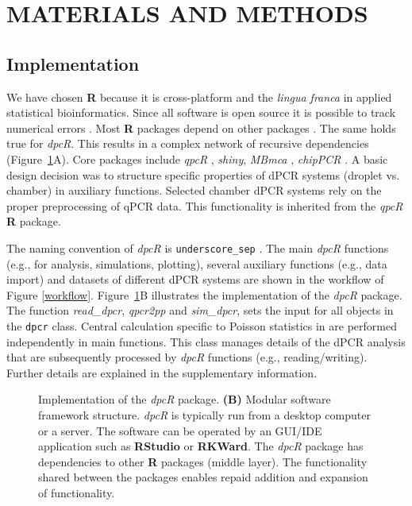 \documentclass[a4,center,fleqn]{NAR}
\begin{document}
\section{MATERIALS AND METHODS}

\subsection{Implementation}

We have chosen \textbf{R} because it is cross-platform and the \textit{lingua 
franca} in applied statistical bioinformatics. Since all software is open 
source 
it is possible to track numerical errors \cite{rodiger_rkward_2012, 
rodiger_r_2015}. Most \textbf{R} packages depend on other packages 
\cite{ooms_2013}. The same holds true for \textit{dpcR}. This results in a 
complex network of recursive dependencies (Figure~\ref{dpcR_framework}A). Core 
packages include \textit{qpcR} \cite{ritz_qpcr_2008}, \textit{shiny}, 
\textit{MBmca} \cite{rodiger_surface_2013}, \textit{chipPCR} 
\cite{roediger2015chippcr}. A basic design decision was to structure specific 
properties of dPCR systems (droplet vs. chamber) in auxiliary functions. 
Selected chamber dPCR systems rely on the proper preprocessing of qPCR data. 
This functionality is inherited from the \textit{qpcR} \textbf{R} package.

The naming convention of \textit{dpcR} is \texttt{underscore\_sep} 
\cite{Baaaath_2012}. The main \textit{dpcR} functions (e.g., for analysis, 
simulations, plotting), several auxiliary functions (e.g., data import) and 
datasets of different dPCR systems are shown in the workflow of Figure 
\ref{workflow}. Figure~\ref{dpcR_framework}B illustrates the implementation of 
the \textit{dpcR} package. The function \textit{read\_dpcr}, \textit{qpcr2pp} 
and \textit{sim\_dpcr}, sets the input for all objects in the \texttt{dpcr} 
class. Central calculation specific to Poisson statistics in are performed 
independently in main functions. This class manages details of the dPCR 
analysis 
that are subsequently processed by \textit{dpcR} functions (e.g., 
reading/writing). Further details are explained in the supplementary 
information.

\begin{figure}[t]
\begin{center}
\end{center}
\caption{Implementation of the \textit{dpcR} package. \textbf{(B)} Modular 
software framework structure. \textit{dpcR} is typically run from a desktop 
computer or a server. The software can be operated by an GUI/IDE application 
such as \textbf{RStudio} or \textbf{RKWard}. The \textit{dpcR} package has 
dependencies to other \textbf{R} packages (middle layer). The functionality 
shared between the packages enables repaid addition and expansion of 
functionality.}
\label{dpcR_framework}
\end{figure}
\end{document}
